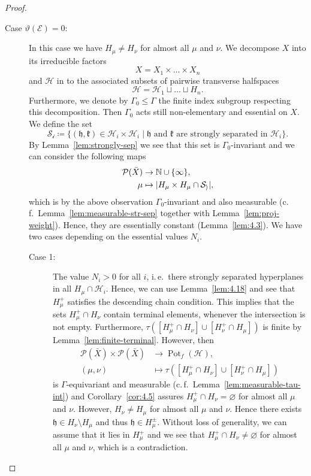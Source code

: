 \begin{proof}
\begin{description}
  \item[Case \(\vartheta(\mathcal{E})=0\):] In this case we have \(H_\mu \neq H_\nu\) for almost all \(\mu\) and \(\nu\). We decompose \(X\) into its irreducible factors
    \[
      X = X_1 \times \dots \times X_n
    \]
    and \(\mathcal{H}\) in to the associated subsets of pairwise transverse halfspaces
    \[
      \mathcal{H} = \mathcal{H}_1 \sqcup \dots \sqcup H_n.
    \]
    Furthermore, we denote by \(\Gamma_0 \leq \Gamma\) the finite index subgroup respecting this decomposition. Then \(\Gamma_0\) acts still non-elementary and essential on \(X\). We define the set
    \[
      \mathcal{S_i} \coloneqq \{(\mathfrak{h}, \mathfrak{k}) \in \mathcal{H}_i \times \mathcal{H}_i \mid \mathfrak{h} \text{ and } \mathfrak{k} \text{ are strongly separated in } \mathcal{H}_i\}.
    \]
    By Lemma~\ref{lem:strongly-sep} we see that this set is \(\Gamma_0\)-invariant and we can consider the following maps
    \begin{align*}
      \mathcal{P}(\bar X) &\to \mathbb{N} \cup \{\infty\},\\
      \mu &\mapsto |H_\mu \times H_\mu \cap \mathcal{S_i}|,
    \end{align*}
    which is by the above observation \(\Gamma_0\)-invariant and also measurable (c.\,f.\ Lemma~\ref{lem:measurable-str-sep} together with Lemma~\ref{lem:proj-weight}). Hence, they are essentially constant (Lemma~\ref{lem:4.3}). We have two cases depending on the essential values \(N_i\).
    \begin{description}
    \item[Case 1:] The value \(N_i > 0\) for all \(i\), i.\,e.\ there strongly separated hyperplanes in all \(H_\mu \cap \mathcal{H}_i\). Hence, we can use Lemma~\ref{lem:4.18} and see that \(H_\mu^+\) satisfies the descending chain condition. This implies that the sets \(H_\mu^+ \cap H_\nu\) contain terminal elements, whenever the intersection is not empty. Furthermore, \(\tau([H_\mu^+ \cap H_\nu] \cup [H_\nu^+ \cap H_\mu])\) is finite by Lemma~\ref{lem:finite-terminal}. However, then
      \begin{align*}
        \mathcal{P}(\bar X) \times \mathcal{P}(\bar X) &\to \operatorname{Pot}_f(\mathcal{H}),\\
        (\mu,\nu) &\mapsto \tau([H_\mu^+ \cap H_\nu] \cup [H_\nu^+ \cap H_\mu])
      \end{align*}
      is \(\Gamma\)-equivariant and measurable (c.\,f.\ Lemma~\ref{lem:measurable-tau-int}) and Corollary~\ref{cor:4.5} assures \(H_\mu^+ \cap H_\nu = \varnothing\) for almost all \(\mu\) and \(\nu\). However, \(H_\nu \neq H_\mu\) for almost all \(\mu\) and \(\nu\). Hence there exists \(\mathfrak{h} \in H_\nu \setminus H_\mu\) and thus \(\mathfrak{h} \in H_\mu^\pm\). Without loss of generality, we can assume that it lies in \(H_\mu^+\) and we see that \(H_\mu^+ \cap H_\nu \neq \varnothing\) for almost all \(\mu\) and \(\nu\), which is a contradiction.

\end{description}
\end{description}
\end{proof}
